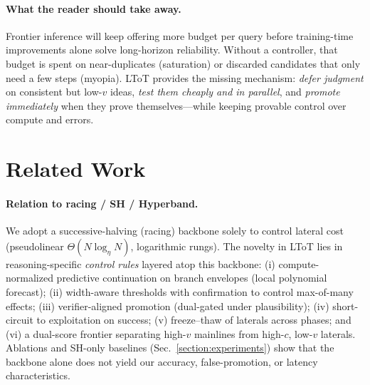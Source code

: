 \documentclass{article}
\begin{document}
\paragraph{What the reader should take away.}
Frontier inference will keep offering more budget per query before training-time improvements alone solve long-horizon reliability.
Without a controller, that budget is spent on near-duplicates (saturation) or discarded candidates that only need a few steps (myopia).
LToT provides the missing mechanism: \emph{defer judgment} on consistent but low-$v$ ideas, \emph{test them cheaply and in parallel}, and \emph{promote immediately} when they prove themselves—while keeping provable control over compute and errors.

\section{Related Work}
\label{section:prior-work}


\paragraph{Relation to racing / SH / Hyperband.}
We adopt a successive-halving (racing) backbone solely to control lateral cost (pseudolinear $\Theta(N\log_\eta N)$, logarithmic rungs).
The novelty in LToT lies in reasoning-specific \emph{control rules} layered atop this backbone:
(i) compute-normalized predictive continuation on branch envelopes (local polynomial forecast);
(ii) width-aware thresholds with confirmation to control max-of-many effects;
(iii) verifier-aligned promotion (dual-gated under plausibility);
(iv) short-circuit to exploitation on success;
(v) freeze--thaw of laterals across phases; and
(vi) a dual-score frontier separating high-$v$ mainlines from high-$c$, low-$v$ laterals.
Ablations and SH-only baselines (Sec.~\ref{section:experiments}) show that the backbone alone does not yield our accuracy, false-promotion, or latency characteristics.
\end{document}
